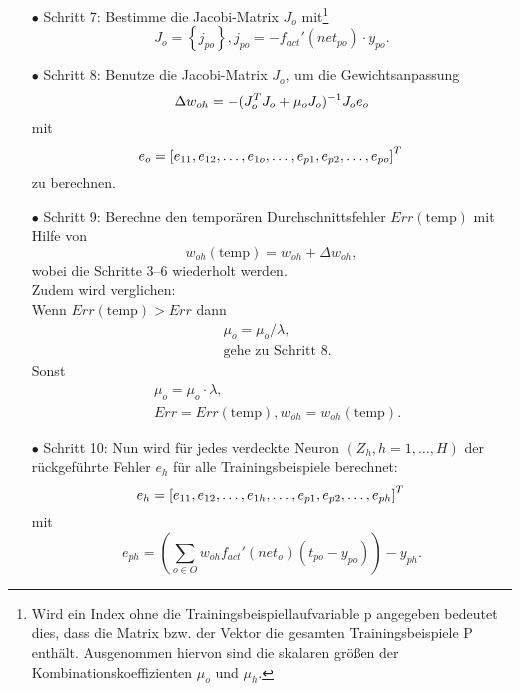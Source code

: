 \begin{itemize}
\item[\textbf{$\bullet$}] Schritt 7: Bestimme die Jacobi-Matrix $J_{o}$ mit\footnote{Wird ein Index ohne die Trainingsbeispiellaufvariable p angegeben bedeutet dies, dass die Matrix bzw. der Vektor die gesamten Trainingsbeispiele P enthält. Ausgenommen hiervon sind die skalaren größen der Kombinationskoeffizienten $\mu_o$ und $\mu_h$.}
\begin{equation}
J_{o}= \left \{ j_{po} \right \}, j_{po}=-f_{act}'(net_{po}) \cdot y_{po}.
\end{equation}

\item[\textbf{$\bullet$}] Schritt 8: Benutze die Jacobi-Matrix $J_{o}$, um die Gewichtsanpassung
\begin{equation}
\Delta w_{oh}=-(J_{o}^T J_{o} + \mu_{o} J_{o})^{-1} J_{o} e_{o}\\
\end{equation}
mit
\begin{equation}
e_{o}= \left [ e_{11}, e_{12}, \dots, e_{1o}, \dots, e_{p1}, e_{p2}, \dots, e_{po} \right ]^T\\
\end{equation}
zu berechnen.

\item[\textbf{$\bullet$}] Schritt 9: Berechne den temporären Durchschnittsfehler $Err(\text{temp})$ mit Hilfe von
\begin{equation}
w_{oh}(\text{temp})= w_{oh} + \Delta w_{oh},
\end{equation}
wobei die Schritte 3--6 wiederholt werden.\\
Zudem wird verglichen:\\
Wenn $Err(\text{temp}) > Err$ dann
\begin{align*}
&\mu_o = \mu_o / \lambda, \\
&\text{gehe zu Schritt 8.}
\end{align*}
Sonst
\begin{align*}
&\mu_o = \mu_o \cdot \lambda, \\
&Err=Err(\text{temp}), w_{oh}=w_{oh}(\text{temp}).
\end{align*}

\item[\textbf{$\bullet$}] Schritt 10: Nun wird für jedes verdeckte Neuron $(Z_h,h=1,\dots,H)$ der rückgeführte Fehler $e_{h}$ für alle Trainingsbeispiele berechnet:
\begin{equation}
e_{h}= \left [ e_{11}, e_{12}, \dots, e_{1h}, \dots, e_{p1}, e_{p2}, \dots, e_{ph} \right ]^T\\
\end{equation}
mit
\begin{equation}
e_{ph} = \left (    \sum\limits_{o \in O} w_{oh} f_{act}'(net_{o}) (t_{po}-y_{po})  \right )  - y_{ph}.
\end{equation}



\end{itemize}
